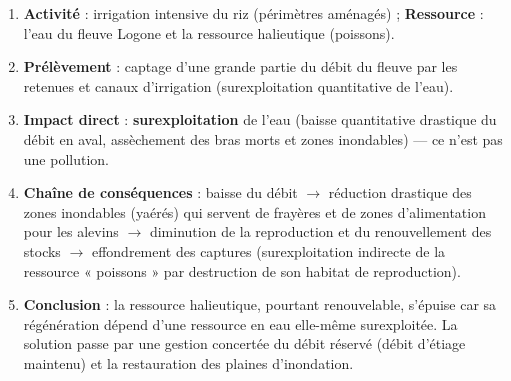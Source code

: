 \documentclass[11pt]{article}
\begin{document}
\begin{corrige}
\begin{enumerate}
  \item \textbf{Activité} : irrigation intensive du riz (périmètres aménagés) ; \textbf{Ressource} : l'eau du fleuve Logone et la ressource halieutique (poissons).
  \item \textbf{Prélèvement} : captage d'une grande partie du débit du fleuve par les retenues et canaux d'irrigation (surexploitation quantitative de l'eau).
  \item \textbf{Impact direct} : \textbf{surexploitation} de l'eau (baisse quantitative drastique du débit en aval, assèchement des bras morts et zones inondables) — ce n'est pas une pollution.
  \item \textbf{Chaîne de conséquences} : baisse du débit $\to$ réduction drastique des zones inondables (yaérés) qui servent de frayères et de zones d'alimentation pour les alevins $\to$ diminution de la reproduction et du renouvellement des stocks $\to$ effondrement des captures (surexploitation indirecte de la ressource « poissons » par destruction de son habitat de reproduction).
  \item \textbf{Conclusion} : la ressource halieutique, pourtant renouvelable, s'épuise car sa régénération dépend d'une ressource en eau elle-même surexploitée. La solution passe par une gestion concertée du débit réservé (débit d'étiage maintenu) et la restauration des plaines d'inondation.
\end{enumerate}
\end{corrige}
\end{document}
